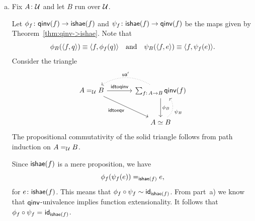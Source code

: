 \begin{solution}
\begin{enumerate}[a)]
        Since $\fun2$ is a set by Theorem~\ref{thm:boolean-type-is-set}, the function type $\fun2\to\fun2$ is a set by part~f) of Theorem~\ref{thm:sets}. Note that we can use this part of the theorem because it relies on function extensionality, which we derived from $\fun{qinv}$-univalence in the previous part of this exercise.
        
        In addition, $\fun{qinv}(f)$ is a set by Proposition~\ref{prop:qinv-is-a-set}, which also requires function extensionality.
        
        Thus, condition~a) follows from part~e) of Theorem~\ref{thm:sets}.

        Condition~b) does not depend on univalence.

        Condition~c) can be proved as in the theorem because, in our case, the definitional equality $\fun{idtoqinv}_{\fun2,\fun2}(\fun{refl}_{\fun2})\equiv e_\id$ implies the propositional equality $\fun{ua'}(e_\id)\eq{}\fun{refl}_{\fun2}$.
            
        \item Fix $A\colon\univ$ and let $B$ run over $\mathcal U$.
        
        Let $\phi_f\colon\fun{qinv}(f)\to\fun{ishae}(f)$ and $\psi_f\colon\fun{ishae}(f)\to\fun{qinv}(f)$ be the maps given by Theorem~\ref{thm:qinv->ishae}. Note that
        \[
            \phi_B(\langle f,q\rangle)\equiv\langle f,\phi_f(q)\rangle
            \quad\text{and}\quad
            \psi_B(\langle f,e\rangle)\equiv\langle f,\psi_f(e)\rangle.
        \]
        Consider the triangle
        \[
            \begin{tikzcd}[column sep=large,row sep=large]
                A\eq\univ B
                        \arrow[r,"\fun{idtoqinv}"]
                        \arrow[rd,"\fun{idtoeqv}"']
                    &\sum_{f\colon A\to B}\fun{qinv}(f)
                        \arrow[d,"\phi_B"]
                        \arrow[l,dotted,bend right=30,"\fun{ua'}"']\\
                    &A\simeq B
                        \arrow[u,dotted,bend right=50,"\psi_B"']
            \end{tikzcd}
        \]
        The propositional commutativity of the solid triangle follows from path induction on $A\mathrel{=_{\mathcal U}} B$.

        Since $\mathsf{ishae}(f)$ is a mere proposition, we have
        \[
            \phi_f(\psi_f(e))\mathrel{=_{\mathsf{ishae}(f)}}e,
        \]
        for $e\colon\fun{ishae}(f)$. This means that $\phi_f\circ\psi_f\sim\mathsf{id}_{\mathsf{ishae}(f)}$. From part~a) we know that $\fun{qinv}$-univalence implies function extensionality. It follows that $\phi_f\circ\psi_f\mathrel{=_{}}\mathsf{id}_{\mathsf{ishae}(f)}$.


\end{enumerate}
\end{solution}
